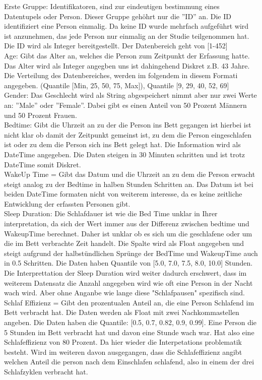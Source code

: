 \documentclass[usegeometry=true]{scrartcl}
\begin{document}
Erste Gruppe: Identifikatoren, sind zur eindeutigen bestimmung eines Datentupels oder Person. Dieser Gruppe gehöhrt nur die ''ID'' an.
Die ID identifiziert eine Person einmalig. Da keine ID wurde mehrfach aufgeführt wird ist anzunehmen, das jede Person nur einmalig an der Studie teilgenommen hat. Die ID wird als Integer bereitgestellt. Der Datenbereich geht von [1-452]
\\ Age: Gibt das Alter an, welches die Person zum Zeitpunkt der Erfassung hatte. Das Alter wird als Integer angegben uns ist dahingehend Diskret z.B. 43 Jahre. Die Verteilung des Datenbereiches, werden im folgendem in diesem Formati angegeben. (Quantile [Min, 25, 50, 75, Max]), Quantile [9, 29, 40, 52, 69]
\\ Gender: Das Geschlecht wird als String abgespeichert nimmt aber nur zwei Werte an: ''Male'' oder ''Female''. Dabei gibt es einen  Anteil von 50 Prozent Männern und 50 Prozent Frauen. 
\\ Bedtime: Gibt die Uhrzeit an zu der die Person ins Bett gegangen ist hierbei ist nicht klar ob damit der Zeitpunkt gemeinst ist, zu dem die Person eingeschlafen ist oder zu dem die Person sich ins Bett gelegt hat.
 Die Information wird als DateTime angegeben. Die Daten steigen in 30 Minuten schritten und ist trotz DateTime somit Diskret. 
\\ WakeUp Time = Gibt das Datum und die Uhrzeit an zu dem die Person erwacht steigt analog zu der Bedtime in halben Stunden Schritten an. Das Datum ist bei beiden DateTime formaten nicht von weiterem interesse, da es keine zeitliche Entwicklung der erfassten Personen gibt. 
\\ Sleep Duration: Die Schlafdauer ist wie die Bed Time unklar in Ihrer interpretation, da sich der Wert immer aus der Differenz zwischen bedtime und WakeupTime berechnet. Daher ist unklar ob es sich um die geschlafene oder um die im Bett verbrachte Zeit handelt. Die Spalte wird als Float angegeben und steigt aufgrund der halbstündlichen Sprünge der BedTime und WakeupTime auch in 0.5 Schritten. Die Daten haben Quantile von [5.0, 7.0, 7.5, 8.0, 10.0] Stunden.
Die Interprettation der Sleep Duration wird weiter dadurch erschwert, dass im weiterem Datensatz die Anzahl angegeben wird wie oft eine Person in der Nacht wach wird. Aber ohne Anganbe wie lange diese "Schlafpausen" spezifisch sind. 
\\ Schlaf Effizienz = Gibt den prozentualen Anteil an, die eine Person Schlafend im Bett verbracht hat. Die Daten werden als Float mit zwei Nachkommastellen angeben. Die Daten haben die Quantile: [0.5, 0.7, 0.82, 0.9, 0.99]. Eine Person die 5 Stunden im Bett verbracht hat und davon eine Stunde wach war. Hat also eine Schlafeffizienz von 80 Prozent. Da hier wieder die Interpetations problematik besteht. Wird im weiteren davon ausgegangen, dass die Schlafeffizienz angibt welchen Anteil die person nach dem Einschlafen schlafend, also in einem der drei Schlafzyklen verbracht hat.
\end{document}
